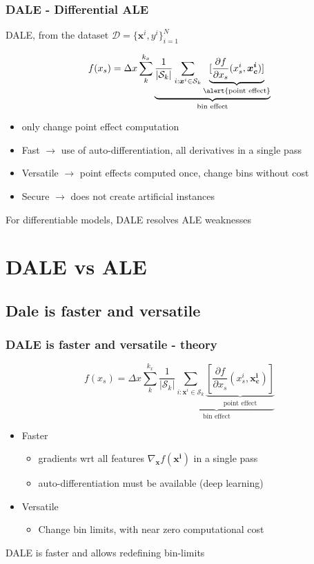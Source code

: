 \documentclass{beamer}
\newcommand{\xb}{\boldsymbol{x}}
\begin{document}
\begin{frame}
  \frametitle{DALE - Differential ALE}
  DALE, from the dataset \(\mathcal{D} = { \{\bm{x}^i, y^i}\}_{i=1}^N\)

    \[f(x_s) = \Delta x \sum_k^{k_x} \underbrace{\frac{1}{|\mathcal{S}_k|} \sum_{i:\xb^i \in \mathcal{S}_k} \underbrace{[\frac{\partial f}{\partial x_s}(x_s^i, \bm{x^i_c})]}_{\text{\alert{point effect}}}}_{\text{bin effect}} \]

    \begin{itemize}
    \item only change point effect computation
    \item Fast \( \rightarrow \) use of auto-differentiation, all derivatives in a single pass
    \item Versatile \( \rightarrow\) point effects computed once, change bins without cost
    \item Secure \( \rightarrow\) does not create artificial instances
    \end{itemize}

  \noindent\makebox[\linewidth]{\rule{\paperwidth}{0.4pt}}
  For \alert{differentiable} models, DALE resolves ALE weaknesses
\end{frame}



\section{DALE vs ALE}

\subsection{Dale is faster and versatile}

\begin{frame}
  \frametitle{DALE is faster and versatile - theory}
    \[f(x_s) = \Delta x \sum_k^{k_x} \underbrace{\frac{1}{|\mathcal{S}_k|} \sum_{i:\xb^i \in \mathcal{S}_k} \underbrace{[\frac{\partial f}{\partial x_s}(x_s^i, \bm{x^i_c})]}_{\text{point effect}}}_{\text{bin effect}} \]

  \begin{itemize}
  \item Faster
    \begin{itemize}
      \item gradients wrt all features \(\nabla_{\bm{x}} f(\bm{x^i})\) in a single pass
      \item auto-differentiation must be available (deep learning)
    \end{itemize}
  \item Versatile
    \begin{itemize}
    \item Change bin limits, with near zero computational cost
    \end{itemize}

  \end{itemize}
  \noindent\makebox[\linewidth]{\rule{\paperwidth}{0.4pt}}
  DALE is faster and allows redefining bin-limits
\end{frame}
\end{document}
